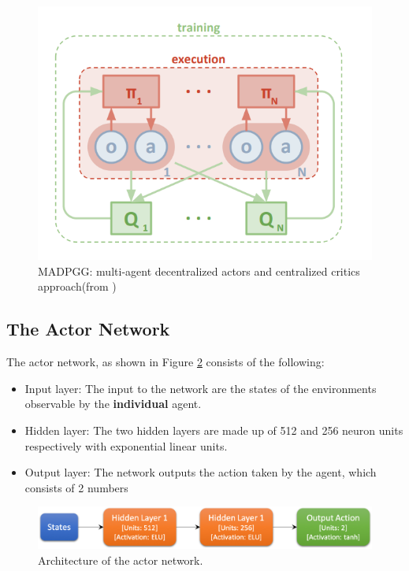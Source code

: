 \documentclass[12pt,twoside]{article}
\begin{document}
\begin{figure}[H]
	\begin{center}
		\includegraphics[width = 0.5\hsize]{./figures/MADDPG.png} 
		\caption{MADPGG: multi-agent decentralized actors and centralized critics approach(from \citep{lowe2017multi})} %
		\label{fig:madpgg_architecture} %
	\end{center}
\end{figure}

\subsection{The Actor Network}

The actor network, as shown in Figure \ref{fig:actor_architecture} consists of the following:
	\begin{itemize}
		\item Input layer: The input to the network are the states of the environments observable by the \textbf{individual} agent.
		\item Hidden layer: The two hidden layers are made up of 512 and 256 neuron units respectively with exponential linear units.
		\item Output layer: The network outputs the action taken by the agent, which consists of 2 numbers
	\end{itemize}

\begin{figure}[H]
	\begin{center}
		\includegraphics[width = 1.0\hsize]{./figures/Actor.png} 
		\caption{Architecture of the actor network.} %
		\label{fig:actor_architecture} %
	\end{center}
\end{figure}
\end{document}
